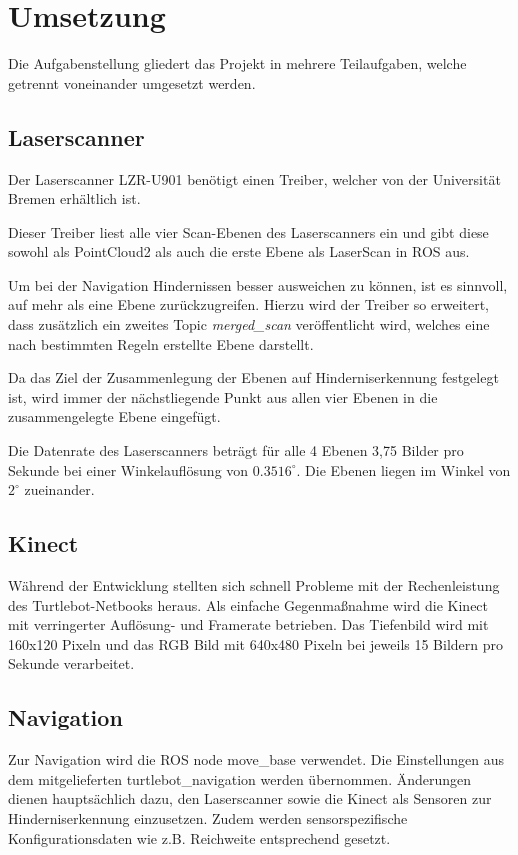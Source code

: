 \section{Umsetzung}
Die Aufgabenstellung gliedert das Projekt in mehrere Teilaufgaben, welche getrennt voneinander umgesetzt werden.

\subsection{Laserscanner}
Der Laserscanner LZR-U901 benötigt einen Treiber, welcher von der Universität Bremen erhältlich ist.

Dieser Treiber liest alle vier Scan-Ebenen des Laserscanners ein und gibt diese sowohl als PointCloud2 als auch die erste Ebene als LaserScan in ROS aus.

Um bei der Navigation Hindernissen besser ausweichen zu können, ist es sinnvoll, auf mehr als eine Ebene zurückzugreifen. Hierzu wird der Treiber so erweitert, dass zusätzlich ein zweites Topic \emph{merged\_scan} veröffentlicht wird, welches eine nach bestimmten Regeln erstellte Ebene darstellt.

Da das Ziel der Zusammenlegung der Ebenen auf Hinderniserkennung festgelegt ist, wird immer der nächstliegende Punkt aus allen vier Ebenen in die zusammengelegte Ebene eingefügt.

Die Datenrate des Laserscanners beträgt für alle 4 Ebenen 3,75 Bilder pro Sekunde bei einer Winkelauflösung von $0.3516^\circ$. Die Ebenen liegen im Winkel von $2^\circ$ zueinander.



\subsection{Kinect}
Während der Entwicklung stellten sich schnell Probleme mit der Rechenleistung des Turtlebot-Netbooks heraus. Als einfache Gegenmaßnahme wird die Kinect mit verringerter Auflösung- und Framerate betrieben. Das Tiefenbild wird mit 160x120 Pixeln und das RGB Bild mit 640x480 Pixeln bei jeweils 15 Bildern pro Sekunde verarbeitet.

\subsection{Navigation}
Zur Navigation wird die ROS node move\_base verwendet. Die Einstellungen aus dem mitgelieferten turtlebot\_navigation werden übernommen. Änderungen dienen hauptsächlich dazu, den Laserscanner sowie die Kinect als Sensoren zur Hinderniserkennung einzusetzen. Zudem werden sensorspezifische Konfigurationsdaten wie z.B. Reichweite entsprechend gesetzt.

